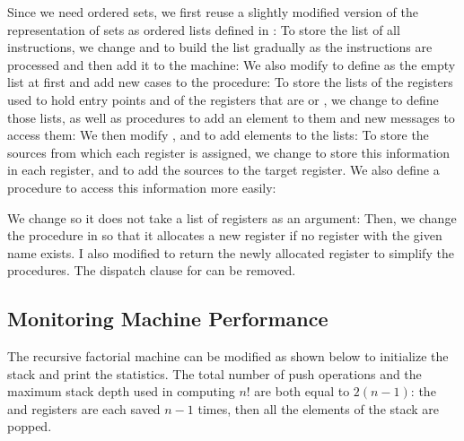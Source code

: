 \begin{exe}[5.12]
    \label{5.12}
    Since we need ordered sets, we first reuse a slightly modified version of 
    the representation of sets as ordered lists defined in 
    :
    To store the list of all instructions, we change  and 
     to build the list gradually as the instructions are 
    processed and then add it to the machine:
    We also modify  to define  as 
    the empty list at first and add new cases to the  procedure:
    To store the lists of the registers used to hold entry points and of the 
    registers that are  or , we change 
     to define those lists, as well as procedures to add 
    an element to them and new messages to access them:
    We then modify ,  and  to 
    add elements to the lists:
    To store the sources from which each register is assigned, we change 
     to store this information in each register, and 
     to add the sources to the target register. We also define 
    a  procedure to access this information more easily:
\end{exe}

\begin{exe}[5.13]
    We change  so it does not take a list of registers as an 
    argument:
    Then, we change the  procedure in 
     so that it allocates a new register if no register 
    with the given name exists. I also modified  to 
    return the newly allocated register to simplify the procedures. The dispatch 
    clause for  can be removed.
\end{exe}

\subsection{Monitoring Machine Performance}

\begin{exe}[5.14]
    The recursive factorial machine can be modified as shown below to initialize 
    the stack and print the statistics.
    The total number of push operations and the maximum stack depth used in 
    computing $n!$ are both equal to $2 (n - 1)$: the  and 
     registers are each saved $n - 1$ times, then all the 
    elements of the stack are popped.
\end{exe}

